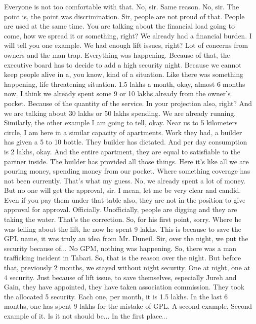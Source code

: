 Everyone is not too comfortable with that.
No, sir.
Same reason.
No, sir.
The point is, the point was discrimination.
Sir, people are not proud of that.
People are used at the same time.
You are talking about the financial load going to come, how we spread it or something, right?
We already had a financial burden.
I will tell you one example.
We had enough lift issues, right?
Lot of concerns from owners and the man trap.
Everything was happening.
Because of that, the executive board has to decide to add a high security night.
Because we cannot keep people alive in a, you know, kind of a situation.
Like there was something happening, life threatening situation.
1.5 lakhs a month, okay, almost 6 months now.
I think we already spent some 9 or 10 lakhs already from the owner's pocket.
Because of the quantity of the service.
In your projection also, right?
And we are talking about 30 lakhs or 50 lakhs spending.
We are already running.
Similarly, the other example I am going to tell, okay.
Near us to 5 kilometers circle, I am here in a similar capacity of apartments.
Work they had, a builder has given a 5 to 10 bottle.
They builder has dictated.
And per day consumption is 2 lakhs, okay.
And the entire apartment, they are equal to satisfiable to the partner inside.
The builder has provided all those things.
Here it's like all we are pouring money, spending money from our pocket.
Where something coverage has not been currently.
That's what my guess.
No, we already spent a lot of money.
But no one will get the approval, sir.
I mean, let me be very clear and candid.
Even if you pay them under that table also, they are not in the position to give approval for approval.
Officially.
Unofficially, people are digging and they are taking the water.
That's the correction.
So, for his first point, sorry.
Where he was telling about the lift, he now he spent 9 lakhs.
This is because to save the GPL name, it was truly an idea from Mr. Duneil.
Sir, over the night, we put the security because of...
No GPM, nothing was happening.
So, there was a man trafficking incident in Tabari.
So, that is the reason over the night.
But before that, previously 2 months, we stayed without night security.
One at night, one at 4 security.
Just because of lift issue, to save themselves, especially Jureh and Gain,
they have appointed, they have taken association commission.
They took the allocated 5 security.
Each one, per month, it is 1.5 lakhs.
In the last 6 months, one has spent 9 lakhs for the mistake of GPL.
A second example.
Second example of it.
Is it not should be...
In the first place...
